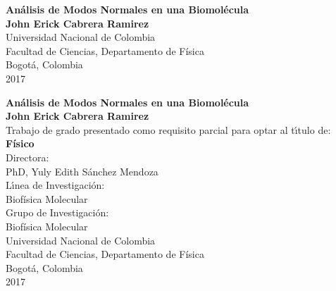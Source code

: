 \begin{center}
\begin{figure}
\centering%
%
\end{figure}
\thispagestyle{empty} \vspace*{2.0cm} \textbf{\huge
An\'{a}lisis de Modos Normales \vspace{1cm}
en una Biomol\'{e}cula}\\[5.0cm]
\Large\textbf{John Erick Cabrera Ramirez}\\[6.0cm]
\small Universidad Nacional de Colombia\\
Facultad de Ciencias, Departamento de F\'{i}sica\\
Bogot\'{a}, Colombia\\
2017\\
\end{center}


\newpage
\begin{center}
\thispagestyle{empty} \vspace*{-0.5cm} \textbf{\huge An\'{a}lisis de Modos Normales \vspace{0.2cm} en una Biomol\'{e}cula}\\[3.0cm]
\Large\textbf{John Erick Cabrera Ramirez}\\[3.0cm]
\small Trabajo de grado presentado como requisito parcial para optar al t\'{\i}tulo de:\\
\textbf{F\'{i}sico}\\[2.5cm]
Directora:\\
PhD, Yuly Edith S\'{a}nchez Mendoza \\[2.0cm]
L\'{\i}nea de Investigaci\'{o}n:\\
Biof\'{i}sica Molecular\\
Grupo de Investigaci\'{o}n:\\
Biof\'{i}sica Molecular\\[2.5cm]
Universidad Nacional de Colombia\\
Facultad de Ciencias, Departamento de F\'{i}sica\\
Bogot\'{a}, Colombia\\
2017\\
\end{center}

